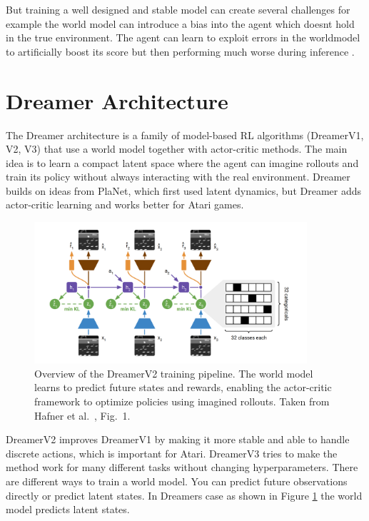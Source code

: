 \documentclass[
	english,
	ruledheaders=section,
	class=report,
	thesis={type=master},
	accentcolor=9c,
	custommargins=true,
	marginpar=false,
	parskip=half-,
	fontsize=11pt,
]{tudapub}
\begin{document}
But training a well designed and stable model can create several challenges for
example the world model can introduce a bias into the agent which doesnt hold
in the true environment. The agent can learn to exploit errors in the
worldmodel to artificially boost its score but then performing much worse
during inference \cite{talvitie2017self,lambert2020learning}.

\section{Dreamer Architecture}
\label{sec:dreamer_architecture}

The Dreamer architecture is a family of model-based RL algorithms (DreamerV1,
V2, V3) that use a world model together with actor-critic methods. The main
idea is to learn a compact latent space where the agent can imagine rollouts
and train its policy without always interacting with the real environment.
Dreamer builds on ideas from PlaNet, which first used latent dynamics, but
Dreamer adds actor-critic learning and works better for Atari games.

\begin{figure}[ht]
	\centering
	\includegraphics[width=0.9\textwidth]{images/DreamerFlow.png}
	\caption{Overview of the DreamerV2 training pipeline. The world model learns to predict future states and rewards, enabling the actor-critic framework to optimize policies using imagined rollouts. Taken from Hafner et al.~\cite{hafner2021mastering}, Fig.~1.}
	\label{fig:dreamer_flow}
\end{figure}

DreamerV2 improves DreamerV1 by making it more stable and able to handle
discrete actions, which is important for Atari. DreamerV3 tries to make the
method work for many different tasks without changing hyperparameters. There
are different ways to train a world model. You can predict future observations
directly or predict latent states. In Dreamers case as shown in Figure
\ref{fig:dreamer_flow} the world model predicts latent states.
\end{document}
